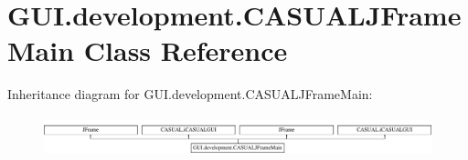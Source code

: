 \hypertarget{classGUI_1_1development_1_1CASUALJFrameMain}{\section{G\-U\-I.\-development.\-C\-A\-S\-U\-A\-L\-J\-Frame\-Main Class Reference}
\label{classGUI_1_1development_1_1CASUALJFrameMain}
}
Inheritance diagram for G\-U\-I.\-development.\-C\-A\-S\-U\-A\-L\-J\-Frame\-Main\-:\begin{figure}[H]
\begin{center}
\leavevmode
\includegraphics[height=1.166667cm]{classGUI_1_1development_1_1CASUALJFrameMain}
\end{center}
\end{figure}
